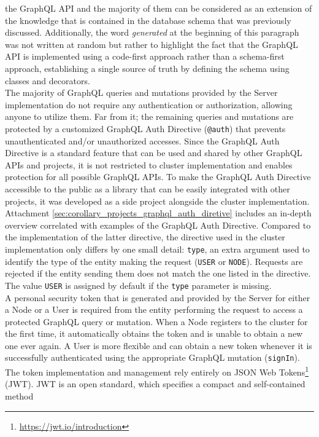 the GraphQL API and the majority of them can be considered as an extension of
the knowledge that is contained in the database schema that was previously
discussed. Additionally, the word \textit{generated} at the beginning of this paragraph
was not written at random but rather to highlight the fact that the GraphQL API is
implemented using a code-first approach rather than a schema-first approach,
establishing a single source of truth by defining the schema using classes and
decorators. \\ %
The majority of GraphQL queries and mutations provided by the Server
implementation do not require any authentication or authorization, allowing anyone
to utilize them. Far from it; the remaining queries and mutations are protected by
a customized GraphQL Auth Directive (\texttt{@auth}) that prevents
unauthenticated and/or unauthorized accesses. Since the GraphQL Auth Directive is
a standard feature that can be used and shared by other GraphQL APIs and projects,
it is not restricted to cluster implementation and enables protection for all
possible GraphQL APIs. To make the GraphQL Auth Directive accessible to the public
as a library that can be easily integrated with other projects, it was developed
as a side project alongside the cluster implementation. Attachment \ref{sec:corollary_projects_graphql_auth_diretive}
includes an in-depth overview correlated with examples of the GraphQL Auth Directive.
Compared to the implementation of the latter directive, the directive used in the
cluster implementation only differs by one small detail: \texttt{type}, an extra
argument used to identify the type of the entity making the request (\texttt{USER}
or \texttt{NODE}). Requests are rejected if the entity sending them does not match
the one listed in the directive. The value \texttt{USER} is assigned by default if
the \texttt{type} parameter is missing. \\ %
A personal security token that is generated and provided by the Server for
either a Node or a User is required from the entity performing the request to
access a protected GraphQL query or mutation. When a Node registers to the cluster
for the first time, it automatically obtains the token and is unable to obtain a
new one ever again. A User is more flexible and can obtain a new token whenever it
is successfully authenticated using the appropriate GraphQL mutation (\texttt{signIn}).
The token implementation and management rely entirely on JSON Web Tokens\footnote{\url{https://jwt.io/introduction}}
(JWT). JWT is an open standard, which specifies a compact and self-contained method
